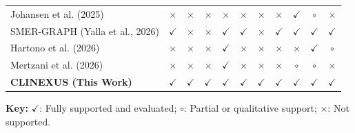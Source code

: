 \documentclass[12pt,a4paper]{report}
\begin{document}
\begin{table}[H]
\begin{tabularx}{\textwidth}{lcccccccccc}
Johansen et al. (2025) & $\times$ & $\times$ & $\times$ & $\times$ & $\times$ & $\times$ & $\times$ & $\checkmark$ & $\circ$ & $\times$ \\
SMER-GRAPH (Yalla et al., 2026) & $\checkmark$ & $\times$ & $\times$ & $\checkmark$ & $\checkmark$ & $\times$ & $\checkmark$ & $\checkmark$ & $\checkmark$ & $\checkmark$ \\
Hartono et al. (2026) & $\times$ & $\times$ & $\times$ & $\checkmark$ & $\times$ & $\times$ & $\times$ & $\times$ & $\checkmark$ & $\circ$ \\
Mertzani et al. (2026) & $\times$ & $\times$ & $\times$ & $\checkmark$ & $\times$ & $\times$ & $\times$ & $\circ$ & $\circ$ & $\times$ \\
\midrule
\textbf{CLINEXUS (This Work)} & $\mathbf{\checkmark}$ & $\mathbf{\checkmark}$ & $\mathbf{\checkmark}$ & $\mathbf{\checkmark}$ & $\mathbf{\checkmark}$ & $\mathbf{\checkmark}$ & $\mathbf{\checkmark}$ & $\mathbf{\checkmark}$ & $\mathbf{\checkmark}$ & $\mathbf{\checkmark}$ \\
\bottomrule
\end{tabularx}
\vspace{0.1cm}
\begin{flushleft}
\scriptsize \textbf{Key:} $\checkmark$: Fully supported and evaluated; $\circ$: Partial or qualitative support; $\times$: Not supported.
\end{flushleft}
\end{table}
\end{document}
